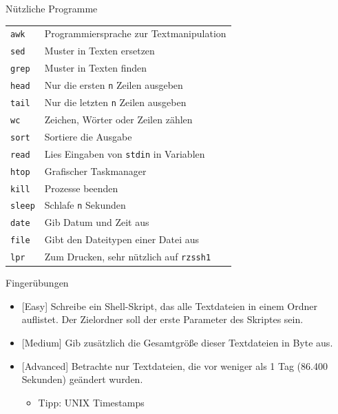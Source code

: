\documentclass[compress]{beamer}
\begin{document}
\begin{frame}[fragile]{Nützliche Programme}
\begin{tabularx}{\textwidth}{lX}
\verb+awk+ & Programmiersprache zur Textmanipulation
\\
\verb+sed+ & Muster in Texten ersetzen
\\
\verb+grep+ & Muster in Texten finden
\\
\verb+head+ & Nur die ersten \verb+n+ Zeilen ausgeben
\\
\verb+tail+ & Nur die letzten \verb+n+ Zeilen ausgeben
\\
\verb+wc+ & Zeichen, Wörter oder Zeilen zählen
\\
\verb+sort+ & Sortiere die Ausgabe
\\
\verb+read+ &Lies Eingaben von \verb+stdin+ in Variablen
\\
\verb+htop+ & Grafischer Taskmanager
\\
\verb+kill+ &  Prozesse beenden
\\
\verb+sleep+ & Schlafe \verb+n+ Sekunden
\\
\verb+date+ & Gib Datum und Zeit aus
\\
\verb+file+ & Gibt den Dateitypen einer Datei aus
\\
\verb+lpr+ & Zum Drucken, sehr nützlich auf \verb+rzssh1+
\end{tabularx}
\end{frame}

\begin{frame}[fragile]{Fingerübungen}
\begin{itemize}
\item {} {\color{darkred}[Easy]} Schreibe ein Shell-Skript, das alle Textdateien in einem Ordner auflistet. Der Zielordner soll der erste Parameter des Skriptes sein.
\item {} {\color{darkred}[Medium]} Gib zusätzlich die Gesamtgröße dieser Textdateien in Byte aus.
\item {} {\color{darkred}[Advanced]} Betrachte nur Textdateien, die vor weniger als 1 Tag (86.400 Sekunden) geändert wurden.
\begin{itemize}
\item Tipp: UNIX Timestamps
\end{itemize}
\end{itemize}
\end{frame}
\end{document}
